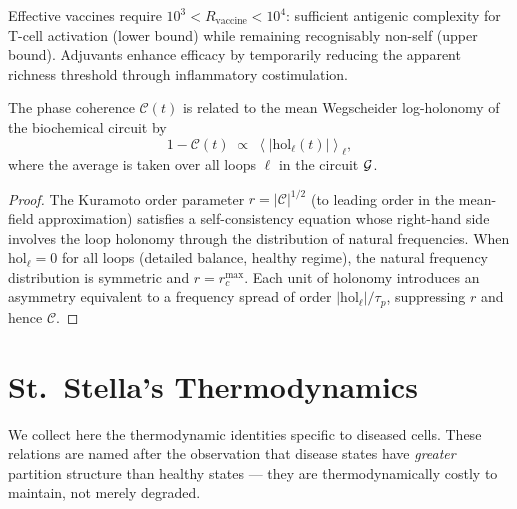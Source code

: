 \begin{corollary}
\label{cor:ch07-vaccine-richness}
Effective vaccines require $10^3 < R_{\mathrm{vaccine}} < 10^4$:
sufficient antigenic complexity for T-cell activation (lower bound) while
remaining recognisably non-self (upper bound).  Adjuvants enhance efficacy
by temporarily reducing the apparent richness threshold through inflammatory
costimulation.
\end{corollary}

\begin{proposition}
\label{prop:coherence-holonomy}
The phase coherence $\mathcal{C}(t)$ is related to the mean Wegscheider
log-holonomy of the biochemical circuit by
\begin{equation}
  1 - \mathcal{C}(t)
  \;\propto\;
  \left\langle |\mathrm{hol}_\ell(t)| \right\rangle_\ell,
  \label{eq:coherence-holonomy}
\end{equation}
where the average is taken over all loops $\ell$ in the circuit $\mathcal{G}$.
\end{proposition}

\begin{proof}
The Kuramoto order parameter $r = |\mathcal{C}|^{1/2}$ (to leading order
in the mean-field approximation) satisfies a self-consistency equation
whose right-hand side involves the loop holonomy through the distribution
of natural frequencies.  When $\mathrm{hol}_\ell = 0$ for all loops
(detailed balance, healthy regime), the natural frequency distribution is
symmetric and $r = r_c^{\mathrm{max}}$.  Each unit of holonomy introduces
an asymmetry equivalent to a frequency spread of order
$|\mathrm{hol}_\ell|/\tau_p$, suppressing $r$ and hence $\mathcal{C}$.
\end{proof}

\section{St.\ Stella's Thermodynamics}
\label{sec:stellas}

We collect here the thermodynamic identities specific to diseased cells.
These relations are named after the observation that disease states have
\emph{greater} partition structure than healthy states — they are
thermodynamically costly to maintain, not merely degraded.

